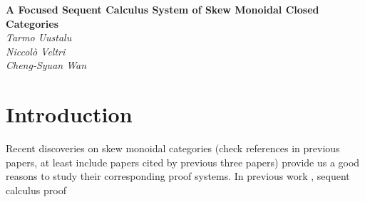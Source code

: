 \documentclass{article}
\begin{document}
\begin{titlepage}
   \begin{center}
      \Large\textbf{A Focused Sequent Calculus System of Skew Monoidal Closed Categories}\\
      \large\textit{Tarmo Uustalu}\\
      \large\textit{Niccol\`o Veltri}\\
      \large\textit{Cheng-Syuan Wan}
   \end{center}
\end{titlepage}
\section{Introduction}
Recent discoveries on skew monoidal categories \cite{Szlachanyi} \cite{Lack2012} \cite{Lack2014} (check references in previous papers, at least include papers cited by previous three papers) provide us a good reasons to study their corresponding proof systems.
In previous work \cite{Uustalu2018a} \cite{Uustalu2020a} \cite{Uustalu2020b} \cite{Veltri2021}, sequent calculus proof

  
  
\end{document}
